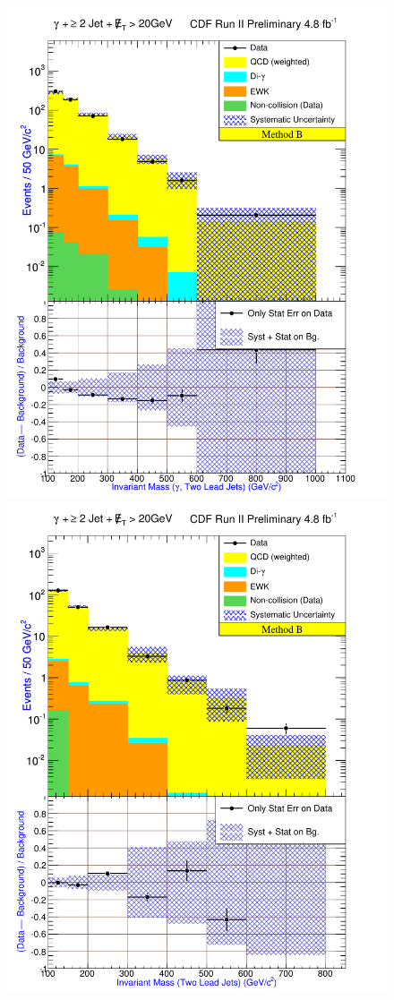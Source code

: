\begin{figure}[h!]
{\includegraphics[keepaspectratio=true, scale=\resultsHistScale]{G30JetsMet20_MtdB_plot2_InvMass_pj1j2.pdf}}
{\includegraphics[keepaspectratio=true, scale=\resultsHistScale]{G30JetsMet20_MtdB_plot2_InvMass_j1j2.pdf}}

\end{figure}
